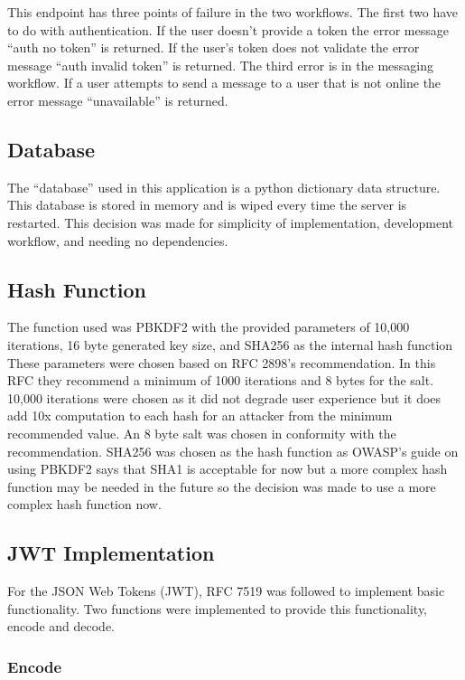 This endpoint has three points of failure in the two workflows. The first two have to do with authentication. If the user doesn’t provide a token the error message “auth no token” is returned. If the user's token does not validate the error message “auth invalid token” is returned. The third error is in the messaging workflow. If a user attempts to send a message to a user that is not online the error message “unavailable” is returned.


\subsection{Database}


The “database” used in this application is a python dictionary data structure. This database is stored in memory and is wiped every time the server is restarted. This decision was made for simplicity of implementation, development workflow, and needing no dependencies. 


\subsection{Hash Function}


The function used was PBKDF2 with the provided parameters of 10,000 iterations, 16 byte generated key size, and SHA256 as the internal hash function \cite{pkcs-rfc}\cite{dsa-rfc} These parameters were chosen based on RFC 2898’s recommendation. In this RFC they recommend a minimum of 1000 iterations and 8 bytes for the salt. 10,000 iterations were chosen as it did not degrade user experience but it does add 10x computation to each hash for an attacker from the minimum recommended value. An 8 byte salt was chosen in conformity with the recommendation. SHA256 was chosen as the hash function as OWASP’s guide on using PBKDF2 says that SHA1 is acceptable for now but a more complex hash function may be needed in the future so the decision was made to use a more complex hash function now. \cite{owasp-pbkdf}


\subsection{JWT Implementation}


For the JSON Web Tokens (JWT), RFC 7519 was followed to implement basic functionality. \cite{jwt-rfc} Two functions were implemented to provide this functionality, encode and decode.


\subsubsection{Encode}


